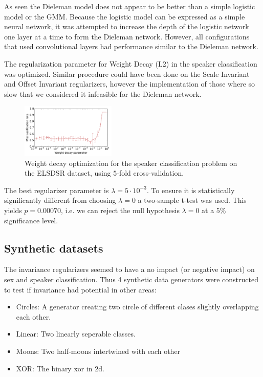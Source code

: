 As seen the Dieleman model does not appear to be better than a simple logistic model or the GMM. Because the logistic model can be expressed as a simple neural network, it was attempted to increase the depth of the logistic network one layer at a time to form the Dieleman network. However, all configurations that used convolutional layers had performance similar to the Dieleman network.

The regularization parameter for Weight Decay (L2) in the speaker classification was optimized. Similar procedure could have been done on the Scale Invariant and Offset Invariant regularizers, however the implementation of those where so slow that we considered it infeasible for the Dieleman network.

\begin{figure}[H]
  \centering
  \includegraphics[width=0.4\textwidth]{plots/reg_opt_dieleman_speaker_elsdsr}
  \caption{Weight decay optimization for the speaker classification problem on the ELSDSR dataset, using $5$-fold cross-validation.}
  \label{fig:reg_opt}
\end{figure}

The best regularizer parameter is $\lambda = 5 \cdot 10^{-3}$. To ensure it is statistically significantly different from choosing $\lambda = 0$ a two-sample t-test was used. This yields $p = 0.00070$, i.e. we can reject the null hypothesis $\lambda=0$ at a $5\%$ significance level.

\subsection{Synthetic datasets}

The invariance regularizers seemed to have a no impact (or negative impact) on sex and speaker classification. Thus 4 synthetic data generators were constructed to test if invariance had potential in other areas:
\begin{itemize}
\item{Circles: A generator creating two circle of different clases slightly overlapping each other.}
\item{Linear: Two linearly seperable classes.}
\item{Moons: Two half-moons intertwined with each other}
\item{XOR: The binary xor in 2d.}
\end{itemize}

